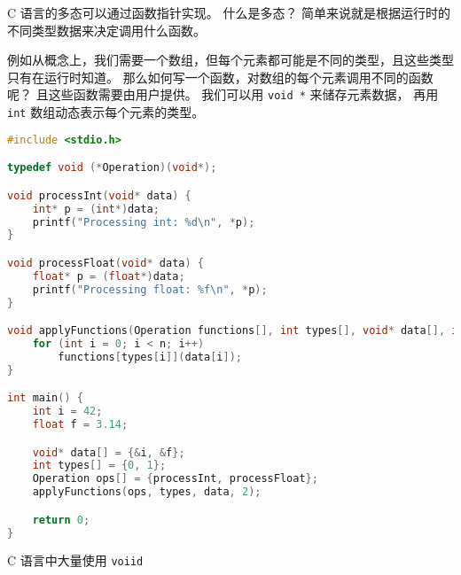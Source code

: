 

C 语言的多态可以通过函数指针实现。 什么是多态？ 简单来说就是根据运行时的不同类型数据来决定调用什么函数。

例如从概念上，我们需要一个数组，但每个元素都可能是不同的类型，且这些类型只有在运行时知道。 那么如何写一个函数，对数组的每个元素调用不同的函数呢？ 且这些函数需要由用户提供。 我们可以用 \verb`void *` 来储存元素数据， 再用 \verb`int` 数组动态表示每个元素的类型。

\begin{lstlisting}[language=cpp]
#include <stdio.h>

typedef void (*Operation)(void*);

void processInt(void* data) {
    int* p = (int*)data;
    printf("Processing int: %d\n", *p);
}

void processFloat(void* data) {
    float* p = (float*)data;
    printf("Processing float: %f\n", *p);
}

void applyFunctions(Operation functions[], int types[], void* data[], int n) {
    for (int i = 0; i < n; i++)
        functions[types[i]](data[i]);
}

int main() {
    int i = 42;
    float f = 3.14;

    void* data[] = {&i, &f};
    int types[] = {0, 1};
    Operation ops[] = {processInt, processFloat};
    applyFunctions(ops, types, data, 2);

    return 0;
}
\end{lstlisting}

C 语言中大量使用 \verb`voiid `